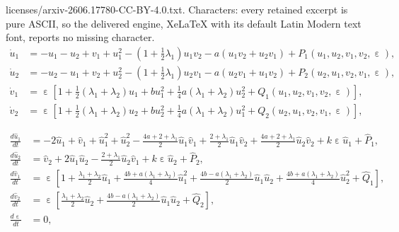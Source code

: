 \documentclass[10pt,a4paper]{amsart}
\DeclareMathOperator{\eps}{\varepsilon}
\begin{document}
licenses/arxiv-2606.17780-CC-BY-4.0.txt. Characters: every retained excerpt is pure ASCII, so the delivered engine, XeLaTeX with its default Latin Modern text font, reports no missing character.
\begin{equation} \label{eq:normalform}
  \begin{split}
    \dot u_1 &= -u_1-u_2+v_1+u_1^2-\left( 1+\tfrac{1}{2}\lambda_1 \right) u_1 v_2 -a (u_1 v_2+u_2 v_1) + P_1(u_1,u_2,v_1,v_2,\eps), \\
    \dot u_2 &= -u_2-u_1+v_2+u_2^2  - \left( 1+\tfrac{1}{2}\lambda_1 \right) u_2 v_1 -a (u_2 v_1+u_1 v_2)+ P_2(u_2,u_1,v_2,v_1,\eps), \\
    \dot v_1 &= \eps \left[ 1+\tfrac{1}{2} (\lambda_1+\lambda_2) u_1+ b u_1^2 + \tfrac{1}{4} a (\lambda_1+\lambda_2)u_2^2 + Q_1(u_1,u_2,v_1,v_2,\eps) \right], \\ 
    \dot v_2 &= \eps \left[ 1+\tfrac{1}{2} (\lambda_1+\lambda_2) u_2 + b u_2^2+ \tfrac{1}{4} a \left( \lambda_1+\lambda_2 \right) u_1^2  + Q_2(u_2,u_1,v_2,v_1,\eps) \right],
  \end{split}
\end{equation}

\begin{equation} \label{eq:nfsymasym}
  \begin{split}
    \frac{d\hat u_1}{dt} &= -2\hat u_1 + \hat v_1 + \hat u_1^2+\hat u_2^2 - \tfrac{4a+2+\lambda_1}{2} \hat u_1 \hat v_1 + \tfrac{2+\lambda_1}{2}\hat u_1 \hat v_2+\tfrac{4a+2+\lambda_1}{2} \hat u_2 \hat v_2 + k \eps \hat u_1 + \hat P_1, \\
    \frac{d\hat u_2}{dt} &= \hat v_2+2 \hat u_1 \hat u_2-\tfrac{2+\lambda_1}{2} \hat u_2 \hat v_1+k \eps \hat u_2 + \hat P_2, \\
    \frac{d\hat v_1}{dt} &= \eps \left[ 1+\tfrac{\lambda_1+\lambda_2}{2} \hat u_1 + \tfrac{4b+a(\lambda_1+\lambda_2)}{4} \hat u_1^2 + \tfrac{4b-a(\lambda_1+\lambda_2)}{2} \hat u_1 \hat u_2 + \tfrac{4b+a(\lambda_1+\lambda_2)}{4} \hat u_2^2 + \hat Q_1 \right], \\
    \frac{d\hat v_2}{dt} &= \eps \left[ \tfrac{\lambda_1+\lambda_2}{2} \hat u_2 +\tfrac{4b-a(\lambda_1+\lambda_2)}{2} \hat u_1 \hat u_2 + \hat Q_2 \right], \\
    \frac{d\eps}{dt} &= 0,
  \end{split}
\end{equation}
\end{document}
